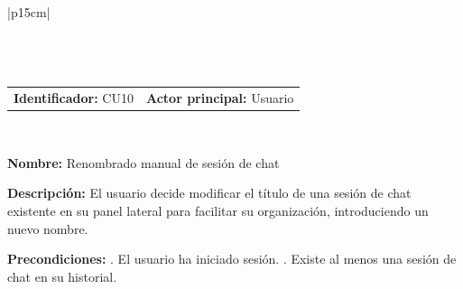 \begingroup
{}
\setlength{\arrayrulewidth}{1pt}
\begin{longtable}{|p{15cm}|}
  \hline
   \\
  \hline
  \endfirsthead
   \\
  \hline
   \\
  \hline
  \endhead
  \hline {} \\ \hline
  \endfoot
  \hline
  \caption{Caso de Uso CU10 — Renombrado manual de sesión de chat.}
  \label{TB:CU10_RENOMBRAR_SESION}
  \endlastfoot

  \begin{tabularx}{\linewidth}{@{}X X@{}}
    \textbf{Identificador:} CU10 & \textbf{Actor principal:} Usuario
  \end{tabularx} \\ \hline

  \textbf{Nombre:} Renombrado manual de sesión de chat \\ \hline

  \textbf{Descripción:} \newline 
  El usuario decide modificar el título de una sesión de chat existente en su panel lateral para facilitar su organización, introduciendo un nuevo nombre. \\ \hline

  \textbf{Precondiciones:} . El usuario ha iniciado sesión. . Existe al menos una sesión de chat en su historial. \\ \hline


\end{longtable}

